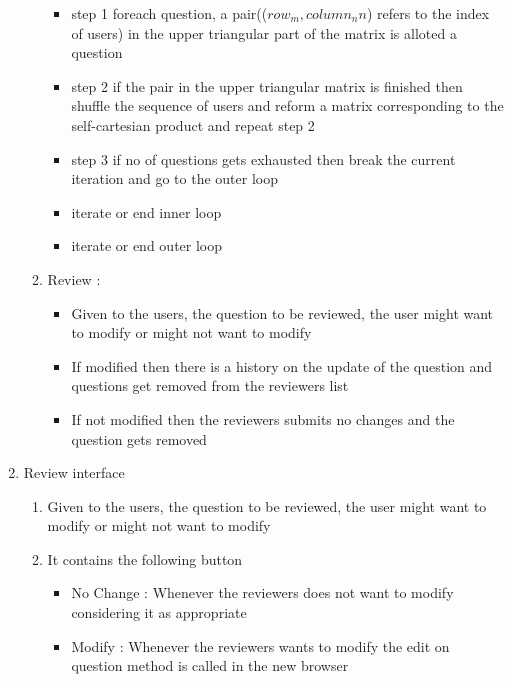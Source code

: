 \documentclass[a4paper,12pt,oneside]{book}
\begin{document}
\begin{enumerate}
\begin{enumerate}
\begin{itemize}
                    \item  step 1 foreach question, a pair((\(row_{m} , column_n{n}\)) refers to the index of users) in the upper triangular part of the matrix is alloted a question
                    \item  step 2 if the pair in the upper triangular matrix is finished then shuffle the sequence of users and reform a matrix corresponding to the self-cartesian product and repeat step 2
                    \item  step 3 if no of questions gets exhausted then break the current iteration and go to the outer loop
                    \item iterate or end inner loop
                    \item iterate or end outer loop
                \end{itemize}
            \item Review :
                \begin{itemize}
                    \item Given to the users, the question  to be reviewed, the user might want to modify or might not want to modify
                    \item If modified then there is a history on the update of the question and questions get removed from the reviewers list
                    \item  If not modified then the reviewers submits no changes and the question gets removed
                \end{itemize}

            \end{enumerate}

        \vspace{1in}
        \item Review interface
            \begin{enumerate}
            \item Given to the users, the question  to be reviewed, the user might want to modify or might not want to modify
            \item It contains the following button
                            \begin{itemize}
                                \item  No Change : Whenever the reviewers does not want to modify considering it as appropriate
                                \item  Modify : Whenever the reviewers wants to modify the edit on question method is called in the new browser 
                            \end{itemize}
           

\end{enumerate}
\end{enumerate}
\end{document}
